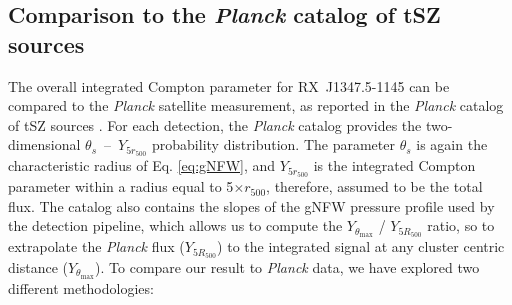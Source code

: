 \subsection{Comparison to the {\it Planck} catalog of tSZ sources}
The overall integrated Compton parameter for \mbox{RX~J1347.5-1145} can be compared to the {\it Planck} satellite measurement, as reported in the {\it Planck} catalog of tSZ sources \citep{Planck_survey}. For each detection, the {\it Planck} catalog provides the two-dimensional  $\theta_s$~--~$Y_{5r_{500}}$ probability distribution. The parameter $\theta_s$ is again the characteristic radius of Eq. \ref{eq:gNFW}, and $Y_{5r_{500}}$ is the integrated Compton parameter within a radius equal to 5$\times r_{500}$, therefore, assumed to be the total flux. The catalog also contains the slopes of the gNFW pressure profile used by the detection pipeline, which allows us to compute the $Y_{\theta_{\mathrm{max}}}$ / $Y_{5R_{500}}$ ratio, so to extrapolate the {\it Planck} flux ($Y_{5R_{500}}$) to the integrated signal at any cluster centric distance ($Y_{\theta_{\mathrm{max}}}$). To compare our result to {\it Planck} data, we have explored two different methodologies:

